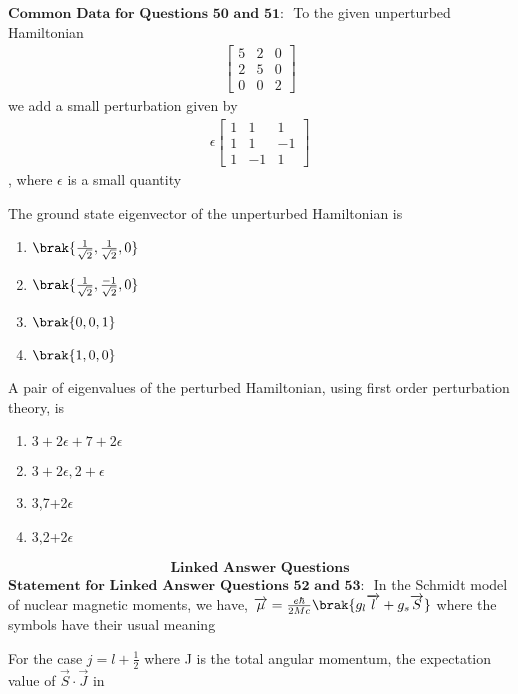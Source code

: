 $\textbf{Common Data for Questions 50 and 51: }$ To the given unperturbed Hamiltonian 
\begin{align*}
\begin{bmatrix}
5 & 2 & 0 \\
2 & 5 & 0 \\
0 & 0 & 2
\end{bmatrix}
\end{align*} we add a small perturbation given by 
\begin{align*}
\epsilon
    \begin{bmatrix}
1 & 1 & 1 \\
1 & 1 & -1 \\
1 & -1 & 1
\end{bmatrix}
\end{align*}, where $\epsilon$ is a small quantity
\bigskip
\item The ground state eigenvector of the unperturbed Hamiltonian is
\begin{multicols}{4}
    \begin{enumerate}
        \item $\brak{\frac{1}{\sqrt{2}},\frac{1}{\sqrt{2}},0}$
        \item $\brak{\frac{1}{\sqrt{2}},\frac{-1}{\sqrt{2}},0}$
        \item $\brak{0,0,1}$
        \item $\brak{1,0,0}$
    \end{enumerate}
\end{multicols}
\item A pair of eigenvalues of the perturbed Hamiltonian, using first order perturbation theory, is 
\begin{multicols}{4}
    \begin{enumerate}
        \item $3+2\epsilon+7+2\epsilon$
        \item $3+2\epsilon,2+\epsilon$
        \item 3,7+2$\epsilon$
        \item 3,2+2$\epsilon$
    \end{enumerate}
\end{multicols}
\bigskip
$$\textbf{Linked Answer Questions}$$
$\textbf{Statement for Linked Answer Questions 52 and 53: }$
\bigskip In the Schmidt model of nuclear magnetic moments,
we have, $\overrightarrow{\mu}=\frac{e\hbar}{2Mc}\brak{g_{l}\overrightarrow{l}+g_{s}\overrightarrow{S}}$ where the symbols have their usual meaning 
\bigskip
\item  For the case $j=l+\frac{1}{2}$ where J is the total angular momentum, the expectation value of $\overrightarrow{S}\cdot\overrightarrow{J}$ in
